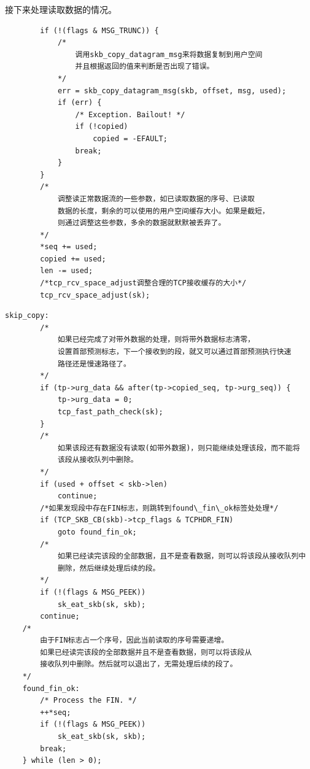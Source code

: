 	接下来处理读取数据的情况。
\begin{verbatim}
		if (!(flags & MSG_TRUNC)) {
			/*
				调用skb_copy_datagram_msg来将数据复制到用户空间
				并且根据返回的值来判断是否出现了错误。
			*/			
			err = skb_copy_datagram_msg(skb, offset, msg, used);
			if (err) {
				/* Exception. Bailout! */
				if (!copied)
					copied = -EFAULT;
				break;
			}
		}
		/*
			调整读正常数据流的一些参数，如已读取数据的序号、已读取
			数据的长度，剩余的可以使用的用户空间缓存大小。如果是截短，
			则通过调整这些参数，多余的数据就默默被丢弃了。
		*/
		*seq += used;
		copied += used;
		len -= used;
		/*tcp_rcv_space_adjust调整合理的TCP接收缓存的大小*/
		tcp_rcv_space_adjust(sk);
\end{verbatim}

	
\begin{verbatim}
skip_copy:
		/*
			如果已经完成了对带外数据的处理，则将带外数据标志清零，
			设置首部预测标志，下一个接收到的段，就又可以通过首部预测执行快速
			路径还是慢速路径了。
		*/
		if (tp->urg_data && after(tp->copied_seq, tp->urg_seq)) {
			tp->urg_data = 0;
			tcp_fast_path_check(sk);
		}
		/*
			如果该段还有数据没有读取(如带外数据)，则只能继续处理该段，而不能将
			该段从接收队列中删除。
		*/
		if (used + offset < skb->len)
			continue;
		/*如果发现段中存在FIN标志，则跳转到found\_fin\_ok标签处处理*/
		if (TCP_SKB_CB(skb)->tcp_flags & TCPHDR_FIN)
			goto found_fin_ok;
		/*
			如果已经读完该段的全部数据，且不是查看数据，则可以将该段从接收队列中
			删除，然后继续处理后续的段。		
		*/
		if (!(flags & MSG_PEEK))
			sk_eat_skb(sk, skb);
		continue;
	/*
		由于FIN标志占一个序号，因此当前读取的序号需要递增。
		如果已经读完该段的全部数据并且不是查看数据，则可以将该段从
		接收队列中删除。然后就可以退出了，无需处理后续的段了。
	*/
	found_fin_ok:
		/* Process the FIN. */
		++*seq;
		if (!(flags & MSG_PEEK))
			sk_eat_skb(sk, skb);
		break;
	} while (len > 0);
\end{verbatim}

